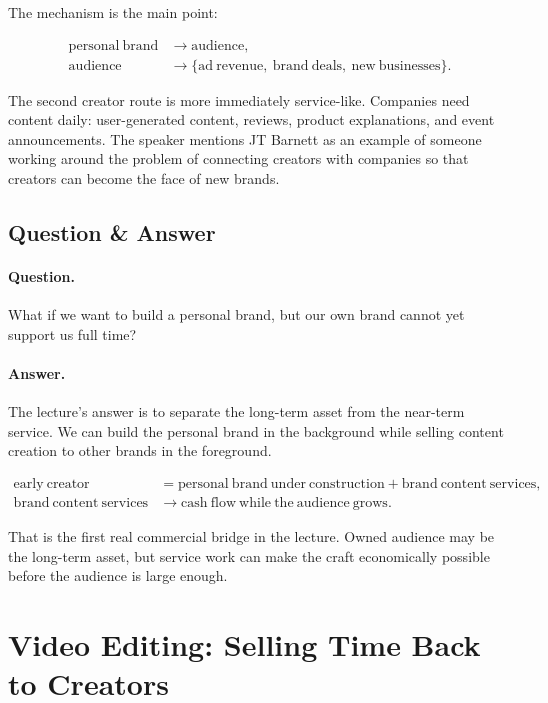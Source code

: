 The mechanism is the main point:

\begin{align}
\mathrm{personal\ brand}
&\longrightarrow
\mathrm{audience},\\
\mathrm{audience}
&\longrightarrow
\{\mathrm{ad\ revenue},\ \mathrm{brand\ deals},\ \mathrm{new\ businesses}\}.
\end{align}

The second creator route is more immediately service-like. Companies need content daily: user-generated content, reviews, product explanations, and event announcements. The speaker mentions JT Barnett as an example of someone working around the problem of connecting creators with companies so that creators can become the face of new brands.

\subsection{Question \& Answer}

\paragraph{Question.}
What if we want to build a personal brand, but our own brand cannot yet support us full time?

\paragraph{Answer.}
The lecture's answer is to separate the long-term asset from the near-term service. We can build the personal brand in the background while selling content creation to other brands in the foreground.

\begin{align}
\mathrm{early\ creator}
&=
\mathrm{personal\ brand\ under\ construction}
+
\mathrm{brand\ content\ services},\\
\mathrm{brand\ content\ services}
&\longrightarrow
\mathrm{cash\ flow\ while\ the\ audience\ grows}.
\end{align}

That is the first real commercial bridge in the lecture. Owned audience may be the long-term asset, but service work can make the craft economically possible before the audience is large enough.

\section{Video Editing: Selling Time Back to Creators}

